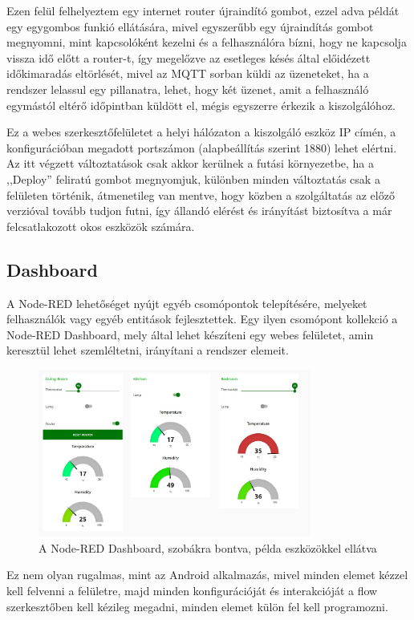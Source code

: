 \documentclass[
]{thesis-ekf}
\theoremstyle{definition}
\theoremstyle{remark}
\begin{document}
Ezen felül felhelyeztem egy internet router újraindító gombot, ezzel adva példát egy egygombos funkió ellátására, mivel egyszerűbb egy újraindítás gombot megnyomni, 
mint kapcsolóként kezelni és a felhasználóra bízni, hogy ne kapcsolja vissza idő előtt a router-t, így megelőzve az esetleges 
késés által előidézett időkimaradás eltörlését, mivel az MQTT sorban küldi az üzeneteket, ha a rendszer lelassul egy pillanatra, 
lehet, hogy két üzenet, amit a felhasználó egymástól eltérő időpintban küldött el, mégis egyszerre érkezik a kiszolgálóhoz.

Ez a webes szerkesztőfelületet a helyi hálózaton a kiszolgáló eszköz IP címén, a konfigurációban megadott portszámon (alapbeállítás szerint 1880) lehet elértni.
Az itt végzett változtatások csak akkor kerülnek a futási környezetbe, ha a ,,Deploy'' feliratú gombot megnyomjuk, különben minden változtatás
csak a felületen történik, átmenetileg van mentve, hogy közben a szolgáltatás az előző verzióval tovább tudjon futni, így
állandó elérést és irányítást biztosítva a már felcsatlakozott okos eszközök számára.

\subsection{Dashboard}
A Node-RED lehetőséget nyújt egyéb csomópontok telepítésére, melyeket felhasználók vagy egyéb entitások fejlesztettek. 
Egy ilyen csomópont kollekció a Node-RED Dashboard\cite{dashboard}, mely által lehet készíteni egy webes felületet, amin keresztül lehet szemléltetni, irányítani a rendszer elemeit. 
\begin{figure}[h]
	\centering
	\includegraphics[width=0.8\textwidth]{images/dashboard.jpg}
	\caption{A Node-RED Dashboard\cite{dashboard}, szobákra bontva, példa eszközökkel ellátva}
\end{figure}


Ez nem olyan rugalmas, mint az Android alkalmazás, mivel minden
elemet kézzel kell felvenni a felületre, majd minden konfigurációját és interakcióját a flow szerkesztőben kell kézileg megadni, minden elemet külön fel kell programozni.
\end{document}

